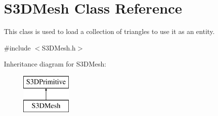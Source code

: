 \hypertarget{class_s3_d_mesh}{
\section{S3DMesh Class Reference}
\label{class_s3_d_mesh}
}


This class is used to load a collection of triangles to use it as an entity.  




{\ttfamily \#include $<$S3DMesh.h$>$}

Inheritance diagram for S3DMesh:\begin{figure}[H]
\begin{center}
\leavevmode
\includegraphics[height=2cm]{class_s3_d_mesh}
\end{center}
\end{figure}
